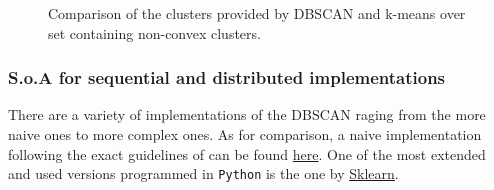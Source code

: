 \documentclass[10pt,journal,compsoc]{IEEEtran}
\let\MYoriglatexcaption\caption
\renewcommand{\caption}[2][\relax]{\MYoriglatexcaption[#2]{#2}}
\begin{document}
\begin{figure}[!h]
\centering
{}
\hfil
{}
\caption{Comparison of the clusters provided by DBSCAN and k-means over set containing non-convex clusters.}
\label{fig_comp_clust}
\end{figure}

\subsubsection{S.o.A for sequential and distributed implementations}


There are a variety of implementations of the DBSCAN raging from the more naive ones to more complex ones. As for comparison, a naive implementation following the exact guidelines of \cite{ReferencePaper} can be found \href{https://github.com/csegarragonz/DBSCAN-pyCOMPSs/blob/master/ext_versions/DBSCAN_Seq.py}{here}. One of the most extended and used versions programmed in \texttt{Python} is the one by \href{http://scikit-learn.org/stable/modules/generated/sklearn.cluster.DBSCAN.html}{Sklearn}.
\end{document}
